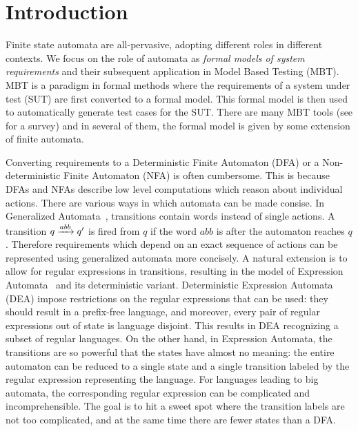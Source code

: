 \section{Introduction}
\label{sec:intro}


  Finite state automata are all-pervasive, adopting different roles in different contexts. We focus on the role of automata as \emph{formal models of system requirements} and their subsequent application in Model Based Testing (MBT). MBT is a paradigm in formal methods where the requirements of a system under test (SUT) are first converted to a formal model. This formal model is then used to automatically generate test cases for the SUT. There are many MBT tools (see \cite{10.1145/1353673.1353681,10.1002/stvr.456} for a survey) and in several of them, the formal model is given by some extension of finite automata. 


  Converting requirements to a Deterministic Finite Automaton (DFA) or a Non-deterministic Finite Automaton (NFA) is often cumbersome. This is because DFAs and NFAs describe low level computations which reason about individual actions. There are various ways in which automata can be made consise. In Generalized Automata~\cite{DBLP:books/lib/Eilenberg76,GIAMMARRESI1999191}, transitions contain words instead of single actions. A transition $q \xrightarrow{abb} q'$ is fired from $q$ if the word $abb$ is after the automaton reaches $q$. Therefore requirements which depend on an exact sequence of actions can be represented using generalized automata more concisely. A natural extension is to allow for regular expressions in transitions, resulting in the model of Expression Automata~\cite{10.1007/978-3-540-30500-2_15} and its deterministic variant. Deterministic Expression Automata (DEA) impose restrictions on the regular expressions that can be used: they should result in a prefix-free language, and moreover, every pair of regular expressions out of state is language disjoint. This results in DEA recognizing a subset of regular languages. On the other hand, in Expression Automata, the transitions are so powerful that the states have almost no meaning: the entire automaton can be reduced to a single state and a single transition labeled by the regular expression representing the language. For languages leading to big automata, the corresponding regular expression can be complicated and incomprehensible. The goal is to hit a sweet spot where the transition labels are not too complicated, and at the same time there are fewer states than a DFA. 

